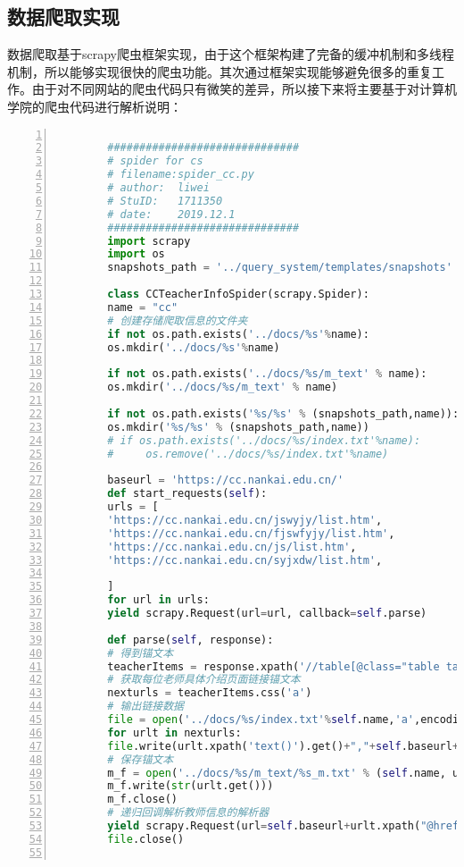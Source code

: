 \documentclass[lang=cn,11pt]{elegantpaper}
\begin{document}
\subsection{数据爬取实现}

数据爬取基于scrapy爬虫框架实现，由于这个框架构建了完备的缓冲机制和多线程机制，所以能够实现很快的爬虫功能。其次通过框架实现能够避免很多的重复工作。由于对不同网站的爬虫代码只有微笑的差异，所以接下来将主要基于对计算机学院的爬虫代码进行解析说明：

\begin{lstlisting}[language =Python, numbers=left, 
numberstyle=\tiny,keywordstyle=\color{blue!70},
commentstyle=\color{red!50!green!50!blue!50},frame=shadowbox,
rulesepcolor=\color{red!20!green!20!blue!20},basicstyle=\ttfamily]

		##############################
		# spider for cs
		# filename:spider_cc.py
		# author:  liwei
		# StuID:   1711350
		# date:    2019.12.1
		##############################
		import scrapy
		import os
		snapshots_path = '../query_system/templates/snapshots'          # 网页快照保存位置
		
		class CCTeacherInfoSpider(scrapy.Spider):
		name = "cc"
		# 创建存储爬取信息的文件夹
		if not os.path.exists('../docs/%s'%name):
		os.mkdir('../docs/%s'%name)
		
		if not os.path.exists('../docs/%s/m_text' % name):      # 锚文本存储文件夹
		os.mkdir('../docs/%s/m_text' % name)
		
		if not os.path.exists('%s/%s' % (snapshots_path,name)):      # 网页快照存储文件夹
		os.mkdir('%s/%s' % (snapshots_path,name))
		# if os.path.exists('../docs/%s/index.txt'%name):
		#     os.remove('../docs/%s/index.txt'%name)
		
		baseurl = 'https://cc.nankai.edu.cn/'
		def start_requests(self):
		urls = [
		'https://cc.nankai.edu.cn/jswyjy/list.htm',
		'https://cc.nankai.edu.cn/fjswfyjy/list.htm',
		'https://cc.nankai.edu.cn/js/list.htm',
		'https://cc.nankai.edu.cn/syjxdw/list.htm',
		
		]
		for url in urls:
		yield scrapy.Request(url=url, callback=self.parse)
		
		def parse(self, response):
		# 得到锚文本
		teacherItems = response.xpath('//table[@class="table table-striped table-bordered"]')
		# 获取每位老师具体介绍页面链接锚文本
		nexturls = teacherItems.css('a')
		# 输出链接数据
		file = open('../docs/%s/index.txt'%self.name,'a',encoding='utf-8')
		for urlt in nexturls:
		file.write(urlt.xpath('text()').get()+","+self.baseurl+urlt.xpath("@href").get()+","+"南开大学计算机学院"+","+response.url+'\n')
		# 保存锚文本
		m_f = open('../docs/%s/m_text/%s_m.txt' % (self.name, urlt.xpath('text()').get()), 'w', encoding='utf-8')
		m_f.write(str(urlt.get()))
		m_f.close()
		# 递归回调解析教师信息的解析器
		yield scrapy.Request(url=self.baseurl+urlt.xpath("@href").get(), callback=self.parseTeacher)
		file.close()
		

\end{lstlisting}
\end{document}
